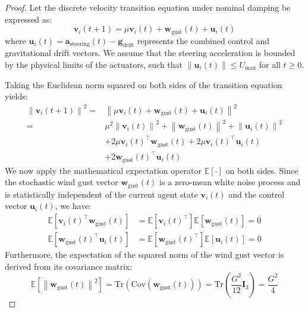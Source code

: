 \documentclass[letterpaper, 10pt, conference]{IEEEtran}
\newcommand{\norm}[1]{\left\lVert#1\right\rVert}
\begin{document}
\begin{proof}
Let the discrete velocity transition equation under nominal damping be expressed as:
\begin{equation}
    \mathbf{v}_i(t+1) = \mu \mathbf{v}_i(t) + \mathbf{w}_{\text{gust}}(t) + \mathbf{u}_i(t)
\end{equation}
where $\mathbf{u}_i(t) = \mathbf{a}_{\text{steering}}(t) - \mathbf{g}_{\text{drift}}$ represents the combined control and gravitational drift vectors. We assume that the steering acceleration is bounded by the physical limits of the actuators, such that $\norm{\mathbf{u}_i(t)} \leq U_{\max}$ for all $t \geq 0$.

Taking the Euclidean norm squared on both sides of the transition equation yields:
\begin{align}
    \norm{\mathbf{v}_i(t+1)}^2 = &\norm{\mu \mathbf{v}_i(t) + \mathbf{w}_{\text{gust}}(t) + \mathbf{u}_i(t)}^2 \nonumber \\
    = &\mu^2 \norm{\mathbf{v}_i(t)}^2 + \norm{\mathbf{w}_{\text{gust}}(t)}^2 + \norm{\mathbf{u}_i(t)}^2 \nonumber \\
    &+ 2\mu \mathbf{v}_i(t)^\top \mathbf{w}_{\text{gust}}(t) + 2\mu \mathbf{v}_i(t)^\top \mathbf{u}_i(t) \nonumber \\
    &+ 2 \mathbf{w}_{\text{gust}}(t)^\top \mathbf{u}_i(t)
\end{align}
We now apply the mathematical expectation operator $\mathbb{E}[\cdot]$ on both sides. Since the stochastic wind gust vector $\mathbf{w}_{\text{gust}}(t)$ is a zero-mean white noise process and is statistically independent of the current agent state $\mathbf{v}_i(t)$ and the control vector $\mathbf{u}_i(t)$, we have:
\begin{align}
    \mathbb{E}\left[\mathbf{v}_i(t)^\top \mathbf{w}_{\text{gust}}(t)\right] &= \mathbb{E}\left[\mathbf{v}_i(t)^\top\right] \mathbb{E}\left[\mathbf{w}_{\text{gust}}(t)\right] = 0 \\
    \mathbb{E}\left[\mathbf{w}_{\text{gust}}(t)^\top \mathbf{u}_i(t)\right] &= \mathbb{E}\left[\mathbf{w}_{\text{gust}}(t)^\top\right] \mathbb{E}\left[\mathbf{u}_i(t)\right] = 0
\end{align}
Furthermore, the expectation of the squared norm of the wind gust vector is derived from its covariance matrix:
\begin{equation}
    \mathbb{E}\left[\norm{\mathbf{w}_{\text{gust}}(t)}^2\right] = \text{Tr}\left(\text{Cov}(\mathbf{w}_{\text{gust}}(t))\right) = \text{Tr}\left(\frac{G^2}{12} \mathbf{I}_3\right) = \frac{G^2}{4}

\end{equation}
\end{proof}
\end{document}
